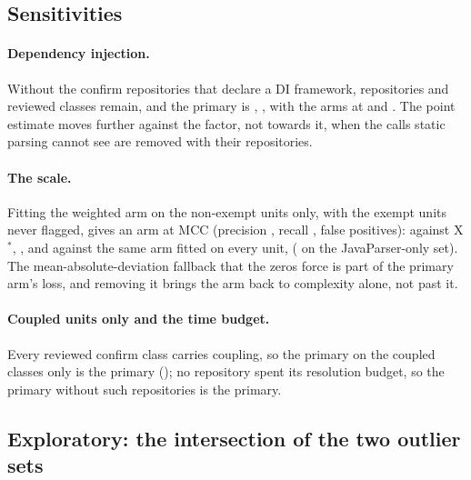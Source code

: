 \documentclass[11pt,a4paper]{article}
\newcommand{\Xs}{X$^*$}
\begin{document}
\subsection{Sensitivities}
\label{sec:sens}

\paragraph{Dependency injection.} Without the confirm repositories that
declare a DI framework, \sensDiRepos{} repositories and \sensDiUniv{}
reviewed classes remain, and the primary is \sensDiMicro{},
\sensDiReading{}, with the arms at \sensDiXMcc{} and \sensDiDMcc{}. The
point estimate moves further against the factor, not towards it, when the
calls static parsing cannot see are removed with their repositories.

\paragraph{The scale.} Fitting the weighted arm on the non-exempt units
only, with the exempt units never flagged, gives an arm at MCC
\sensNeMcc{} (precision \sensNePrecision{}, recall \sensNeRecall{},
\sensNeFp{} false positives): \sensNeVsXMicro{} against \Xs{},
\sensNeVsXReading{}, and \sensNeVsAllMicro{} against the same arm fitted
on every unit, \sensNeVsAllReading{} (\sensJpNeVsAllMicro{} on the
JavaParser-only set). The mean-absolute-deviation fallback that the
zeros force is part of the primary arm's loss, and removing it brings the
arm back to complexity alone, not past it.

\paragraph{Coupled units only and the time budget.} Every reviewed confirm
class carries coupling, so the primary on the coupled classes only is the
primary (\sensUncoupledMicro{}); no repository spent its resolution budget,
so the primary without such repositories is the primary.

\subsection{Exploratory: the intersection of the two outlier sets}
\label{sec:inter}
\end{document}
